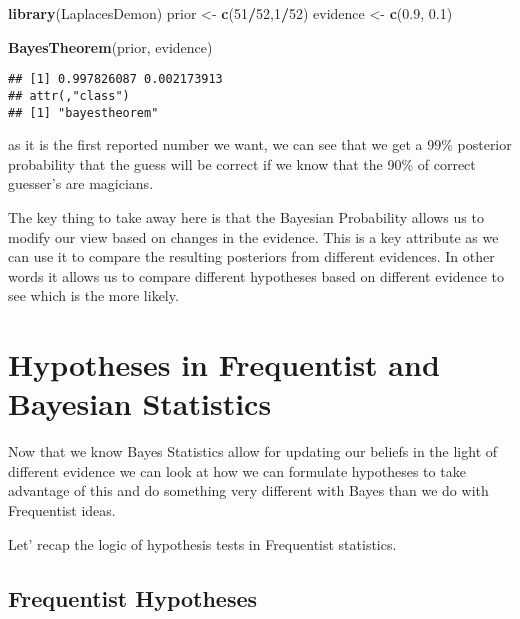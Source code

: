 \documentclass[
]{book}
\newenvironment{Shaded}{\begin{snugshade}}{\end{snugshade}}
\newcommand{\DecValTok}[1]{\textcolor[rgb]{0.00,0.00,0.81}{#1}}
\newcommand{\FloatTok}[1]{\textcolor[rgb]{0.00,0.00,0.81}{#1}}
\newcommand{\KeywordTok}[1]{\textcolor[rgb]{0.13,0.29,0.53}{\textbf{#1}}}
\newcommand{\NormalTok}[1]{#1}
\newcommand{\OperatorTok}[1]{\textcolor[rgb]{0.81,0.36,0.00}{\textbf{#1}}}
\newcommand{\StringTok}[1]{\textcolor[rgb]{0.31,0.60,0.02}{#1}}
\begin{document}
\begin{Shaded}
\begin{Highlighting}[]
\KeywordTok{library}\NormalTok{(LaplacesDemon)}
\NormalTok{prior <-}\StringTok{ }\KeywordTok{c}\NormalTok{(}\DecValTok{51}\OperatorTok{/}\DecValTok{52}\NormalTok{,}\DecValTok{1}\OperatorTok{/}\DecValTok{52}\NormalTok{) }
\NormalTok{evidence <-}\StringTok{ }\KeywordTok{c}\NormalTok{(}\FloatTok{0.9}\NormalTok{, }\FloatTok{0.1}\NormalTok{)}

\KeywordTok{BayesTheorem}\NormalTok{(prior, evidence)}
\end{Highlighting}
\end{Shaded}

\begin{verbatim}
## [1] 0.997826087 0.002173913
## attr(,"class")
## [1] "bayestheorem"
\end{verbatim}

as it is the first reported number we want, we can see that we get a 99\% posterior probability that the guess will be correct if we know that the 90\% of correct guesser's are magicians.

The key thing to take away here is that the Bayesian Probability allows us to modify our view based on changes in the evidence. This is a key attribute as we can use it to compare the resulting posteriors from different evidences. In other words it allows us to compare different hypotheses based on different evidence to see which is the more likely.

\hypertarget{hypotheses-in-frequentist-and-bayesian-statistics}{%
\section{Hypotheses in Frequentist and Bayesian Statistics}\label{hypotheses-in-frequentist-and-bayesian-statistics}}

Now that we know Bayes Statistics allow for updating our beliefs in the light of different evidence we can look at how we can formulate hypotheses to take advantage of this and do something very different with Bayes than we do with Frequentist ideas.

Let' recap the logic of hypothesis tests in Frequentist statistics.

\hypertarget{frequentist-hypotheses}{%
\subsection{Frequentist Hypotheses}\label{frequentist-hypotheses}}
\end{document}
